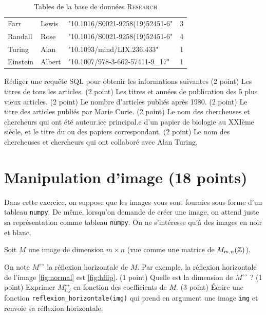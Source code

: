 \begin{table}[h!]
{\begin{tabular}{|lllp{5cm}|}
                Farr                   & Lewis                       & "10.1016/S0021-9258(19)52451-6"              & 3                                                     \\
                Randall                & Rose                        & "10.1016/S0021-9258(19)52451-6"              & 4                                                     \\
                Turing                 & Alan                        & "10.1093/mind/LIX.236.433"                   & 1                                                     \\
                Einstein               & Albert                      & "10.1007/978-3-662-57411-9\_17"              & 1                                                     \\
                \hline
            \end{tabular}
        }
        \caption{Tables de la base de données \textsc{Research}}
        \label{tab:research}
    \end{table}

    \ques Rédiger une requête SQL pour obtenir les informations suivantes
    \ssques (2 point) Les titres de tous les articles.
    \ssques (2 point) Les titres et années de publication des 5 plus vieux articles.
    \ssques (2 point) Le nombre d'articles publiés après 1980.
    \ssques (2 point) Le titre des articles publiés par Marie Curie.
    \ssques (2 point) Le nom des chercheuses et chercheurs qui ont été auteur.ice principal.e d'un papier de biologie au XXIème siècle, et le titre du ou des papiers correspondant.
    \ssques (2 point) Le nom des chercheuses et chercheurs qui ont collaboré avec Alan Turing.

    \section*{Manipulation d'image (18 points)}

    Dans cette exercice, on suppose que les images vous sont fournies sous forme d'un tableau \texttt{numpy}. De même, lorsqu'on demande de créer une image, on attend juste sa représentation comme tableau \texttt{numpy}. On ne s'intéresse qu'à des images en noir et blanc.

    Soit $ M $ une image de dimension $ m \times n $ (vue comme une matrice de $ M_{m,n}(\mathbb{Z}) $).

    \ques On note $ M^{\leftrightarrow} $ la réflexion horizontale de $ M $. Par exemple, la réflexion horizontale de l'image \autoref{fig:normal} est \autoref{fig:hflip}.
    \ssques (1 point) Quelle est la dimension de $ M^{\leftrightarrow} $ ?
    \ssques (1 point) Exprimer $ M^{\leftrightarrow}_{i,j} $ en fonction des coefficients de $ M $.
    \ssques (3 point) Écrire une fonction \texttt{reflexion_horizontale(img)} qui prend en argument une image \texttt{img} et renvoie sa réflexion horizontale.

